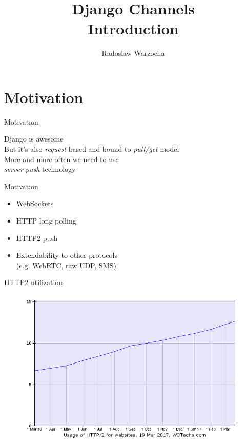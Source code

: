 \documentclass{beamer}
\title{Django Channels\\Introduction}
\author[rwar]{Radoslaw Warzocha}
\begin{document}
\begin{frame}
	\titlepage
\end{frame}

\section{Motivation}

\begin{frame}{Motivation}
	\begin{center}
		Django is awesome\\
		\vspace{1em}
		But it's also \textit{request} based and bound to \textit{pull/get} model\\
		\vspace{1em}
		More and more often we need to use\\
		\textit{server push} technology
	\end{center}
\end{frame}

\begin{frame}{Motivation}
	\begin{adjustwidth}{2em}{2.5em}
	\begin{itemize}
		\item WebSockets
		\item HTTP long polling
		\item HTTP2 push
		\item Extendability to other protocols\\ (e.g. WebRTC, raw UDP, SMS)
	\end{itemize}
	\end{adjustwidth}
\end{frame}

\begin{frame}{HTTP2 utilization}
	\begin{center}
		\begin{figure}
			\includegraphics[scale=0.45]{ce-http2.png}
		\end{figure}
	\end{center}
\end{frame}
\end{document}
